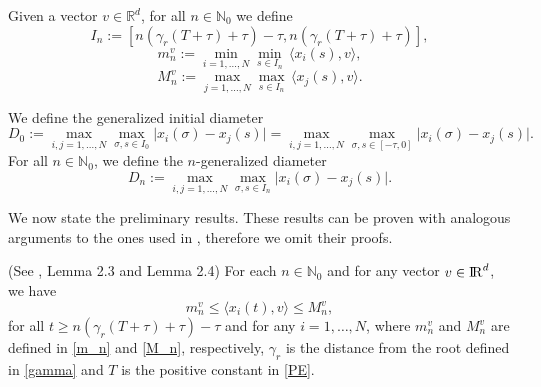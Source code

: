 \documentclass[11pt]{article}
\newcommand{\RR}{{{\rm I} \kern -.15em {\rm R} }}
\begin{document}
		\begin{defn}\label{quantonoff}
		Given a vector $v\in \mathbb{R}^d$, for all $n\in \mathbb{N}_0$ we define
		\begin{equation}\label{In}
			I_n:=[n(\gamma_r (T+\tau)+\tau)-\tau,n(\gamma_r (T+\tau)+\tau)],
		\end{equation}
		\begin{equation}\label{m_n}
			m_n^v:=\min_{i=1,\dots,N}\min_{s\in I_n}\,\langle x_{i}(s),v\rangle,
		\end{equation}
		\begin{equation}\label{M_n}
			M_n^v:=\max_{j=1,\dots,N}\max_{s\in I_n}\,\langle x_{j}(s),v\rangle.
		\end{equation}
	\end{defn} 
    \begin{defn}\label{Dn}
    	We define the generalized initial diameter
    	\begin{equation}\label{D0}
    		D_0:=\max_{i,j =1,\dots, N}\max_{\sigma,s\in I_0}\lvert x_i(\sigma)-x_j(s)\rvert=\max_{i,j =1,\dots, N}\max_{\sigma,s\in [-\tau,0]}\lvert x_i(\sigma)-x_j(s)\rvert.
    	\end{equation}
    	For all $n\in \mathbb{N}_0$, we define the $n$-generalized diameter
    	\begin{equation}\label{D_n}
    		D_n:=\max_{i,j =1,\dots, N}\max_{\sigma,s\in I_n}\lvert x_i(\sigma)-x_j(s)\rvert.
    	\end{equation}
    \end{defn}
      We now state the preliminary results. These results can be proven with analogous arguments to the ones used in \cite{CCP}, therefore we omit their proofs. 
    
	\begin{lem}\label{L1}{(See \cite{CCP}, {Lemma 2.3 and Lemma 2.4})}
		For each $n\in \mathbb{N}_0$ and for any vector $v\in \RR^{d}$, we have 
		\begin{equation}\label{scalpronoff}
			m_n^v\leq \langle x_{i}(t),v\rangle \leq M_n^v,
		\end{equation}for all  $t\geq n(\gamma_r(T+\tau)+\tau)-\tau$ and for any $i=1,\dots,N$, where $m_n^v$ and $M_n^v$ are defined in \eqref{m_n} and \eqref{M_n}, respectively, $\gamma_r$ is the distance from the root defined in \eqref{gamma} and $T$ is the positive constant in \eqref{PE}.
	\end{lem}
\end{document}
